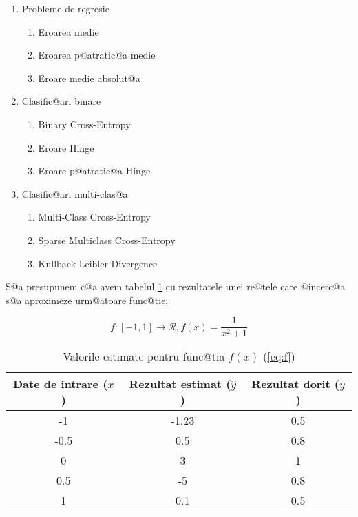 \begin{enumerate}
	\item Probleme de regresie
	\begin{enumerate}
		\item Eroarea medie
		\item Eroarea p@atratic@a medie
		\item Eroare medie absolut@a
	\end{enumerate}
	\item Clasific@ari binare
	\begin{enumerate}
		\item Binary Cross-Entropy
		\item Eroare Hinge
		\item Eroare p@atratic@a Hinge
	\end{enumerate}
	\item Clasific@ari multi-clas@a
	\begin{enumerate}
		\item Multi-Class Cross-Entropy
		\item Sparse Multiclass Cross-Entropy
		\item Kullback Leibler Divergence
	\end{enumerate}
\end{enumerate}

S@a presupunem c@a avem tabelul \ref{tab:nn-functie} cu rezultatele unei re@tele care @incerc@a s@a aproximeze urm@atoare func@tie:

\begin{equation} \label{eq:f}
	f:[-1, 1]\rightarrow \mathcal{R}, f(x) = \displaystyle\frac{1}{x^2+1}
\end{equation}

\begin{table}[h]
	\begin{center}
		\begin{tabular}{|c|c|c|}
			\hline
			Date de intrare ($x$) & Rezultat estimat ($\hat{y}$) & Rezultat dorit ($y$) \\
			\hline
			-1 & -1.23 & 0.5 \\
			\hline
			-0.5 & 0.5 & 0.8 \\
			\hline
			0 & 3 & 1 \\
			\hline
			0.5 & -5 & 0.8 \\ 
			\hline
			1 & 0.1 & 0.5 \\ 
			\hline
		\end{tabular}
	\end{center}
	\caption{Valorile estimate pentru func@tia $f(x)$ (\ref{eq:f})}
	\label{tab:nn-functie}
\end{table}

